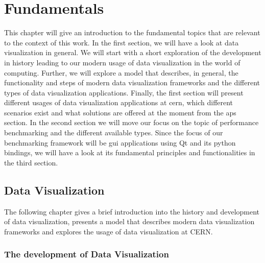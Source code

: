 
\chapter{Fundamentals}
\label{ch:fundamentals}

This chapter will give an introduction to the fundamental topics that are
relevant to the context of this work. In the first section, we will have a look
at data visualization in general. We will start with a short exploration of the
development in history leading to our modern usage of data visualization in the
world of computing. Further, we will explore a model that describes, in general,
the functionality and steps of modern data visualization frameworks and the
different types of data visualization applications. Finally, the first section
will present different usages of data visualization applications at \gls{cern},
which different scenarios exist and what solutions are offered at the moment
from the \gls{aps} section. In the second section we will move our focus on the
topic of performance benchmarking and the different available types. Since the
focus of our benchmarking framework will be \gls{gui} applications using Qt and
its python bindings, we will have a look at its fundamental principles and
functionalities in the third section. 




\section{Data Visualization}
\label{sec:fundamentals:charting}

The following chapter gives a brief introduction into the history and
development of data visualization, presents a model that describes modern data
visualization frameworks and explores the usage of data visualization at CERN.



\subsection{The development of Data Visualization}
\label{sec:fundamentals:charting:history}

